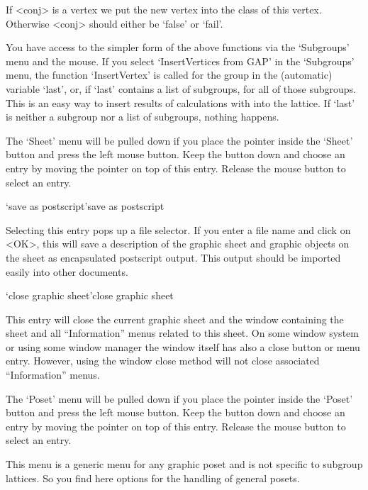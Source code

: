 If <conj> is a vertex we put the new vertex into the class of this
vertex.  Otherwise <conj> should either be `false' or `fail'.

You have access to the simpler form of the above functions via the
`Subgroups' menu and the mouse. If you select 
`InsertVertices from GAP'
in the `Subgroups' menu, the function `InsertVertex' is called 
for the group in the (automatic) variable `last', or, if `last'
contains a list of subgroups, for all of those subgroups. This is an
easy way to insert results of calculations with {\GAP} into the
lattice. If `last' is neither a subgroup nor a list of subgroups,
nothing happens.



The `Sheet' menu will  be pulled down if  you place the pointer inside  the
`Sheet' button  and press the left mouse  button.  Keep the button down and
choose an entry by moving the pointer on  top of this entry.  Release the
mouse button to select an entry.

\>`save as postscript'{save as postscript}

Selecting this entry pops up a file  selector.  If you  enter a file name
and click on <OK>, this will save a  description of the graphic sheet and
graphic objects on  the sheet as encapsulated postscript  output. This
output should be imported easily into other documents.

\>`close graphic sheet'{close graphic sheet}

This entry will close the current graphic sheet and the window containing
the sheet  and all  ``Information'' menus related  to  this sheet.  On some
window system or using  some window manager the window  itself has also a
close button or menu entry.  However,  using the window close method will
not close associated ``Information'' menus.



The `Poset' menu will be pulled down if you place the pointer inside the
`Poset' button and  press the left mouse  button.  Keep  the button down
and choose an entry by moving the pointer on top of  this entry.  Release
the mouse button to select an entry.

This menu is a generic menu for any graphic poset and is not specific to
subgroup lattices. So you find here options for the handling of general
posets. 

